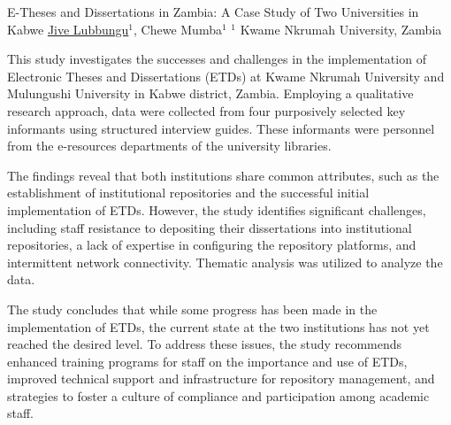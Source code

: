 
    \begin{abstract_online}{E-Theses and Dissertations in Zambia: A Case Study of Two Universities in Kabwe}{%
    \underline{Jive Lubbungu}$^{1}$, Chewe Mumba$^{1}$}{%
    }{%
    $^1$ Kwame Nkrumah University, Zambia
}

This study investigates the successes and challenges in the implementation of Electronic Theses and Dissertations (ETDs) at Kwame Nkrumah University and Mulungushi University in Kabwe district, Zambia. Employing a qualitative research approach, data were collected from four purposively selected key informants using structured interview guides. These informants were personnel from the e-resources departments of the university libraries. 

The findings reveal that both institutions share common attributes, such as the establishment of institutional repositories and the successful initial implementation of ETDs. However, the study identifies significant challenges, including staff resistance to depositing their dissertations into institutional repositories, a lack of expertise in configuring the repository platforms, and intermittent network connectivity. Thematic analysis was utilized to analyze the data.

The study concludes that while some progress has been made in the implementation of ETDs, the current state at the two institutions has not yet reached the desired level. To address these issues, the study recommends enhanced training programs for staff on the importance and use of ETDs, improved technical support and infrastructure for repository management, and strategies to foster a culture of compliance and participation among academic staff.

\end{abstract_online}

